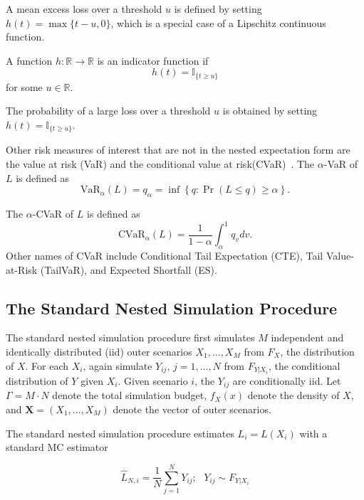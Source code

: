 A mean excess loss over a threshold $u$ is defined by setting $h(t) = \max\{t - u, 0\}$, which is a special case of a Lipschitz continuous function.

\begin{definition} \label{def1:indicator}
    A function $h: \mathbb{R} \rightarrow \mathbb{R}$ is an indicator function if 
    $$h(t) = \mathbb{I}_{\{t \geq u\}}$$
    for some $u \in \mathbb{R}$.
\end{definition}

The probability of a large loss over a threshold $u$ is obtained by setting $h(t) = \mathbb{I}_{\{t \geq u\}}$.

Other risk measures of interest that are not in the nested expectation form are the value at risk (VaR) and the conditional value at risk(CVaR)~\citep{hardy2022quantitative}. 
The $\alpha$-VaR of $L$ is defined as
\begin{equation} \label{eq1:var}
    \mbox{VaR}_\alpha(L) = q_\alpha = \inf \left\{ q: \Pr(L\leq q) \geq \alpha \right\}.
\end{equation}
    
The $\alpha$-CVaR of $L$ is defined as
\begin{equation} \label{eq1:cvar}
    \mbox{CVaR}_\alpha(L) =\frac{1}{1-\alpha} \int_{\alpha}^{1} q_v dv. 
\end{equation}
Other names of CVaR include Conditional Tail Expectation (CTE), Tail Value-at-Risk (TailVaR), and Expected Shortfall (ES).

\subsection{The Standard Nested Simulation Procedure}

The standard nested simulation procedure first simulates $M$ independent and identically distributed (iid) outer scenarios $X_1, \dots, X_M$ from $F_X$, the distribution of $X$.
For each $X_i$, again simulate $Y_{ij}$, $j = 1, \dots, N$ from $F_{Y|X_i}$, the conditional distribution of $Y$ given $X_i$. Given scenario $i$, the $Y_{ij}$ are conditionally iid. Let $\Gamma = M \cdot N$ denote the total simulation budget, $f_X(x)$ denote the density of $X$, and $\mathbf{X} = (X_1, \dots, X_M)$ denote the vector of outer scenarios.

The standard nested simulation procedure estimates $L_i = L(X_i)$ with a standard MC estimator 

$$\hat{L}_{N, i} = \frac{1}{N} \sum_{j=1}^N Y_{ij}; ~~~ Y_{ij} \sim F_{Y|X_i} $$

